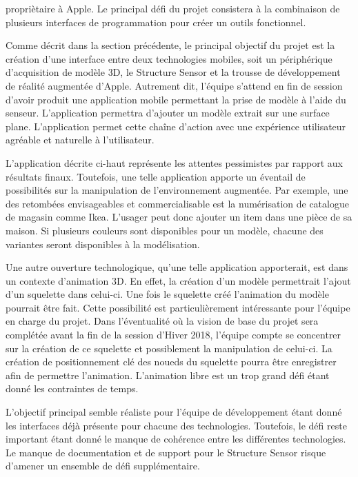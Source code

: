 \documentclass[letterpaper,twoside,12pt,french]{report}
\begin{document}
propriètaire à Apple. Le principal défi du projet consistera à la combinaison de plusieurs
interfaces de programmation pour créer un outils fonctionnel.
\par
Comme décrit dans la section précédente, le principal objectif du projet est la création d'une
interface entre deux technologies mobiles, soit un périphérique d'acquisition de modèle 3D, le
Structure Sensor et la trousse de développement de réalité augmentée d'Apple. Autrement dit,
l'équipe s'attend en fin de session d'avoir produit une application mobile permettant la prise
de modèle à l'aide du senseur. L'application permettra d'ajouter un modèle extrait sur une surface
plane. L'application permet cette chaîne d'action avec une expérience utilisateur agréable et
naturelle à l'utilisateur.
\par
L'application décrite ci-haut représente les attentes pessimistes par rapport aux résultats finaux.
Toutefois, une telle application apporte un éventail de possibilités sur la manipulation de
l'environnement augmentée. Par exemple, une des retombées envisageables et
commercialisable est la numérisation de catalogue de magasin comme Ikea. L'usager peut
donc ajouter un item dans une pièce de sa maison. Si plusieurs couleurs sont disponibles pour
un modèle, chacune des variantes seront disponibles à la modélisation.
\par
Une autre ouverture technologique, qu'une telle application apporterait, est dans un contexte
d'animation 3D. En effet, la création d'un modèle permettrait l'ajout d'un squelette dans celui-ci.
Une fois le squelette créé l'animation du modèle pourrait être fait. Cette possibilité est
particulièrement intéressante pour l'équipe en charge du projet. Dans l'éventualité où la vision
de base du projet sera complétée avant la fin de la session d'Hiver 2018, l'équipe compte se
concentrer sur la création de ce squelette et possiblement la manipulation de celui-ci. La création
de positionnement clé des noueds du squelette pourra être enregistrer afin de permettre l'animation.
L'animation libre est un trop grand défi étant donné les contraintes de temps.
\par
L'objectif principal semble réaliste pour l'équipe de développement étant donné les interfaces déjà
présente pour chacune des technologies. Toutefois, le défi reste important étant donné le manque de
cohérence entre les différentes technologies. Le manque de documentation et de support pour le
Structure Sensor risque d'amener un ensemble de défi supplémentaire.
\par
\end{document}
